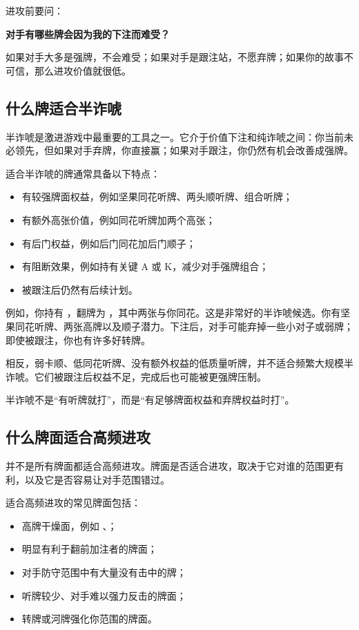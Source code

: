 进攻前要问：

\begin{center}
\textbf{对手有哪些牌会因为我的下注而难受？}
\end{center}

如果对手大多是强牌，不会难受；如果对手是跟注站，不愿弃牌；如果你的故事不可信，那么进攻价值就很低。

\subsection{什么牌适合半诈唬}

半诈唬是激进游戏中最重要的工具之一。它介于价值下注和纯诈唬之间：你当前未必领先，但如果对手弃牌，你直接赢；如果对手跟注，你仍然有机会改善成强牌。

适合半诈唬的牌通常具备以下特点：

\begin{itemize}
\item 有较强牌面权益，例如坚果同花听牌、两头顺听牌、组合听牌；
\item 有额外高张价值，例如同花听牌加两个高张；
\item 有后门权益，例如后门同花加后门顺子；
\item 有阻断效果，例如持有关键 A 或 K，减少对手强牌组合；
\item 被跟注后仍然有后续计划。
\end{itemize}

例如，你持有 ，翻牌为 ，其中两张与你同花。这是非常好的半诈唬候选。你有坚果同花听牌、两张高牌以及顺子潜力。下注后，对手可能弃掉一些小对子或弱牌；即使被跟注，你也有许多好转牌。

相反，弱卡顺、低同花听牌、没有额外权益的低质量听牌，并不适合频繁大规模半诈唬。它们被跟注后权益不足，完成后也可能被更强牌压制。

半诈唬不是“有听牌就打”，而是“有足够牌面权益和弃牌权益时打”。

\subsection{什么牌面适合高频进攻}

并不是所有牌面都适合高频进攻。牌面是否适合进攻，取决于它对谁的范围更有利，以及它是否容易让对手范围错过。

适合高频进攻的常见牌面包括：

\begin{itemize}
\item 高牌干燥面，例如 、；
\item 明显有利于翻前加注者的牌面；
\item 对手防守范围中有大量没有击中的牌；
\item 听牌较少、对手难以强力反击的牌面；
\item 转牌或河牌强化你范围的牌面。
\end{itemize}

